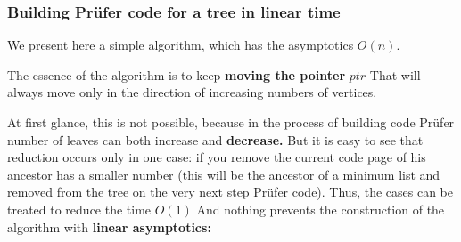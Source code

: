 \subsubsection{ Building Prüfer code for a tree in linear time }

We present here a simple algorithm, which has the asymptotics $O (n)$.

The essence of the algorithm is to keep \textbf{moving the pointer} $ptr$ That will always move only in the direction of increasing numbers of vertices.

At first glance, this is not possible, because in the process of building code Prüfer number of leaves can both increase and \textbf{decrease.} But it is easy to see that reduction occurs only in one case: if you remove the current code page of his ancestor has a smaller number (this will be the ancestor of a minimum list and removed from the tree on the very next step Prüfer code). Thus, the cases can be treated to reduce the time $O (1)$ And nothing prevents the construction of the algorithm with \textbf{linear asymptotics:}

